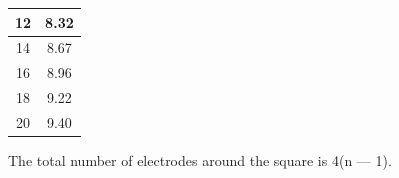 \documentclass[12pt,fleqn]{book} %
\begin{document}
\begin{table}[!h]
\begin{tabular}{!{\color[rgb]{0.557,0.667,0.859}\vrule}c!{\color{black}\vrule}c!{\color[rgb]{0.557,0.667,0.859}\vrule}}
\hline
\textcolor[rgb]{0.118,0.118,0.118}{12}                                                                                                                                                                                                                                                                                                                               & \textcolor[rgb]{0.118,0.118,0.118}{8.32}                                                       \\ 
\hline
{} \textcolor[rgb]{0.118,0.118,0.118}{14}                                                                                                                                                                                                                                                                                             & \textcolor[rgb]{0.118,0.118,0.118}{8.67}                                                       \\ 
\hline
\textcolor[rgb]{0.118,0.118,0.118}{16}                                                                                                                                                                                                                                                                                                                               & \textcolor[rgb]{0.118,0.118,0.118}{8.96}                                                       \\ 
\hline
{} \textcolor[rgb]{0.118,0.118,0.118}{18}                                                                                                                                                                                                                                                                                             & \textcolor[rgb]{0.118,0.118,0.118}{9.22}                                                       \\ 
\hline
\textcolor[rgb]{0.118,0.118,0.118}{20}                                                                                                                                                                                                                                                                                                                               & \textcolor[rgb]{0.118,0.118,0.118}{9.40}                                                       \\
\hline
\end{tabular}
\end{table}
\begin{note}
The total number of electrodes around the square is 4(n — 1).
\end{note}
\end{document}

